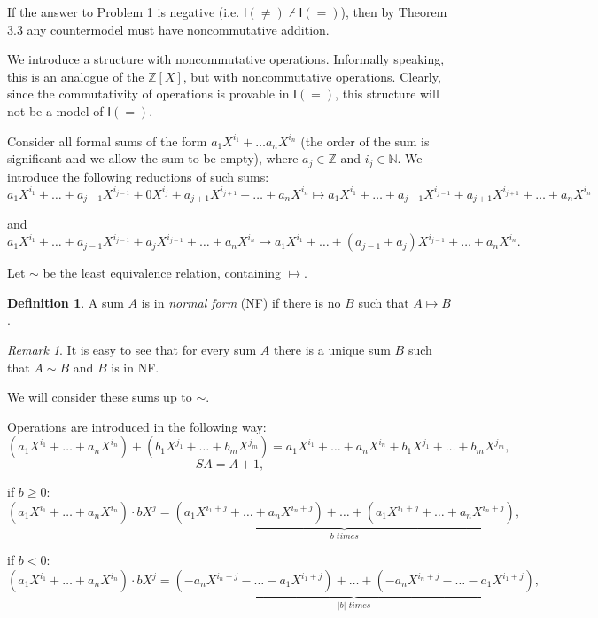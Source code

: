 \documentclass[a4paper,14pt]{article}
\theoremstyle{definition}
\newtheorem{definition}{Definition}[section]
\theoremstyle{theorem}
\theoremstyle{lemma}
\theoremstyle{proposition}
\theoremstyle{remark}
\newtheorem*{remark}{Remark}
\theoremstyle{corollary}
\theoremstyle{problem}
\theoremstyle{hypothesis}
\begin{document}
If the answer to Problem 1 is negative (i.e. $\mathsf I(\ne) \nvdash \mathsf I(=)$), then by Theorem 3.3 any countermodel must have noncommutative addition. 

We introduce a structure with noncommutative operations. Informally speaking, this is an analogue of the $\mathbb Z[X]$, but with noncommutative operations. 
Clearly, since the commutativity of operations is provable in $\mathsf I(=)$, this structure will not be a model of $\mathsf I(=)$. 

Consider all formal sums of the form $a_1 X^{i_1} + \dots a_n X^{i_n}$ (the order of the sum is significant and we allow the sum to be empty), where $a_j \in \mathbb Z$ and $i_j \in \mathbb N$. We introduce the following reductions of such sums: 
$$a_1 X^{i_1} + \dots + a_{j - 1} X^{i_{j - 1}} + 0 X^{i_j} + a_{j + 1} X^{i_{j + 1}} + \dots + a_n X^{i_n} \mapsto a_1 X^{i_1} + \dots + a_{j - 1} X^{i_{j - 1}} + a_{j + 1} X^{i_{j + 1}} + \dots + a_n X^{i_n}$$

and 
$$a_1 X^{i_1} + \dots + a_{j - 1} X^{i_{j - 1}} + a_{j} X^{i_{j - 1}} + \dots + a_n X^{i_n} \mapsto a_1 X^{i_1} + \dots + (a_{j - 1} + a_{j}) X^{i_{j - 1}} + \dots + a_n X^{i_n}.$$

Let $\sim$ be the least equivalence relation, containing $\mapsto$. 

\begin{definition}
    A sum $A$ is in \textit{normal form} (NF) if there is no $B$ such that $A \mapsto B$.
\end{definition}

\begin{remark}
    It is easy to see that for every sum $A$ there is a unique sum $B$ such that $A \sim B$ and $B$ is in NF.
\end{remark}

We will consider these sums up to $\sim$.

Operations are introduced in the following way: 
$$(a_1 X^{i_1} + \dots + a_n X^{i_n}) + (b_1 X^{j_1} + \dots + b_m X^{j_m}) = a_1 X^{i_1} + \dots + a_n X^{i_n} + b_1 X^{j_1} + \dots + b_m X^{j_m},$$
$$S A = A + 1,$$

if $ b \geqslant 0$:
$$(a_1 X^{i_1} + \dots + a_n X^{i_n}) \cdot b X^j = \underbrace{(a_1 X^{i_1 + j} + \dots + a_n X^{i_n + j}) + \dots + (a_1 X^{i_1 + j} + \dots + a_n X^{i_n + j})}_{b \textit{ times}}, $$

if $b < 0$:
$$(a_1 X^{i_1} + \dots + a_n X^{i_n}) \cdot b X^j = \underbrace{(-a_n X^{i_n + j} - \dots - a_1 X^{i_1 + j}) + \dots + (-a_n X^{i_n + j} - \dots - a_1 X^{i_1 + j})}_{|b| \textit{ times}}, $$
\end{document}
